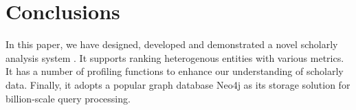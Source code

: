 \section{Conclusions}
\label{sec-conc}

In this paper, we have designed, developed and demonstrated a novel scholarly analysis system \oursystem.
It supports ranking heterogenous entities with various metrics. It has a number of profiling functions to enhance our understanding of scholarly data.
Finally, it adopts a popular graph database Neo4j as its storage solution for billion-scale query processing. 








